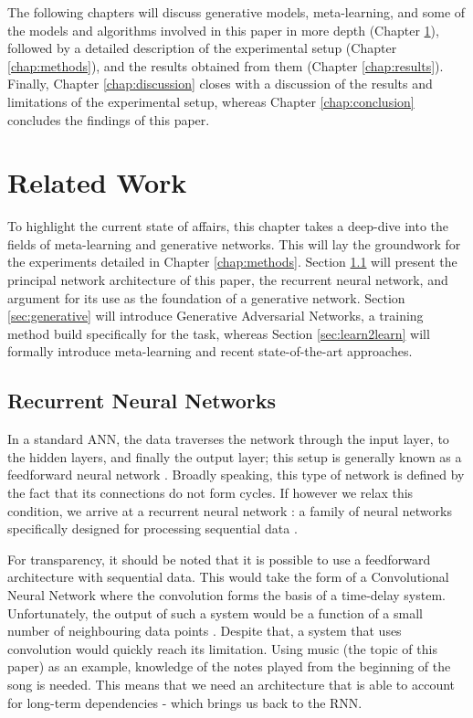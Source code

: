 \documentclass[a4paper]{book}
\begin{document}
The following chapters will discuss generative models, meta-learning, and some of the models and algorithms involved in this paper in more depth (Chapter \ref{chap:theoretical_framework}), followed by a detailed description of the experimental setup (Chapter \ref{chap:methods}), and the results obtained from them (Chapter \ref{chap:results}). Finally, Chapter \ref{chap:discussion} closes with a discussion of the results and limitations of the experimental setup, whereas Chapter \ref{chap:conclusion} concludes the findings of this paper.

\chapter{Related Work}\label{chap:theoretical_framework}

To highlight the current state of affairs, this chapter takes a deep-dive into the fields of meta-learning and generative networks. This will lay the groundwork for the experiments detailed in Chapter \ref{chap:methods}. Section \ref{sec:rnn} will present the principal network architecture of this paper, the recurrent neural network, and argument for its use as the foundation of a generative network. Section \ref{sec:generative} will introduce Generative Adversarial Networks, a training method build specifically for the task, whereas Section \ref{sec:learn2learn} will formally introduce meta-learning and recent state-of-the-art approaches. 

\section{Recurrent Neural Networks} \label{sec:rnn}

In a standard ANN, the data traverses the network through the input layer, to the hidden layers, and finally the output layer; this setup is generally known as a feedforward neural network \parencite[Figure \ref{fig:feedforward_net};][]{graves_supervised_2012}. Broadly speaking, this type of network is defined by the fact that its connections do not form cycles. If however we relax this condition, we arrive at a recurrent neural network \parencite[Figure \ref{fig:rnn_folded};][]{rumelhart_learning_1986}: a family of neural networks specifically designed for processing sequential data \parencite{goodfellow_deep_2016}.

For transparency, it should be noted that it is possible to use a feedforward architecture with sequential data. This would take the form of a Convolutional Neural Network where the convolution forms the basis of a time-delay system. Unfortunately, the output of such a system would be a function of a small number of neighbouring data points \parencite[such as the last and the next three notes in a song;][]{goodfellow_deep_2016}. Despite that, a system that uses convolution would quickly reach its limitation. Using music (the topic of this paper) as an example, knowledge of the notes played from the beginning of the song is needed. This means that we need an architecture that is able to account for long-term dependencies - which brings us back to the RNN.
\end{document}
